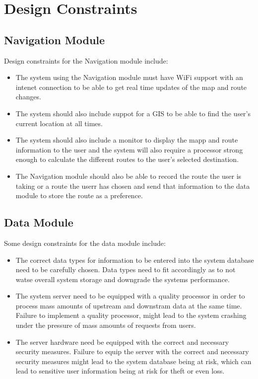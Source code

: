 \documentclass[11pt]{article}
\begin{document}
\section{Design Constraints}

\subsection{Navigation Module}
Design constraints for the Navigation module include:
 \begin{itemize}

      \item The system using the Navigation module must have WiFi support with an intenet connection to be able to get real time updates of the map and route changes.
      \item The system should also include suppot for a GIS to be able to find the user's current location at all times.
       \item The system should also include a monitor to display the mapp and route information to the user and the system will also require a processor strong enough to calculate the different routes to the user's selected destination.
        \item The Navigation module should also be able to record the route the user is taking or a route the userr has chosen and send that information to the data module to store the route as a preference.
      
  \end{itemize}
  
\subsection{Data Module}
Some design constraints for the data module include:
  \begin{itemize}

      \item The correct data types for information to be entered into the system database need to be carefully chosen. 
    Data types need to fit accordingly as to not watse overall system storage and downgrade the systems performance.

      \item The system server need to be equipped with a quality processor in order to process mass amounts of upstream and downstram data at the same time.
    Failure to implement a quality processor, might lead to the system crashing under the pressure of mass amounts of requests from users.

    \item The server hardware need be equipped with the correct and necessary security measures.
    Failure to equip the server with the correct and necessary security measures might lead to the system database being at risk,
    which can lead to sensitive user information being at risk for theft or even loss.

  \end{itemize}
  
\end{document}
